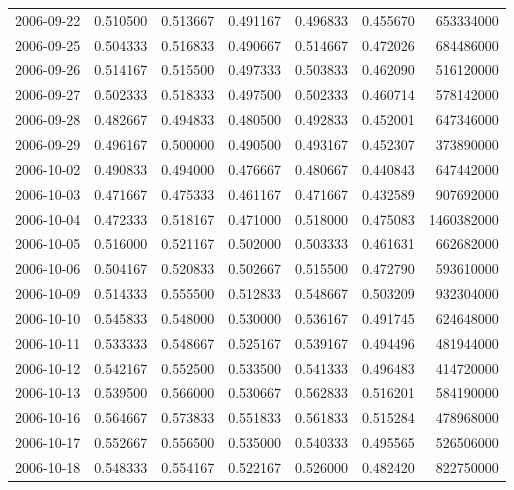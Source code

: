 \begin{tabular}{lrrrrrr}
2006-09-22 &    0.510500 &    0.513667 &    0.491167 &    0.496833 &    0.455670 &   653334000 \\
2006-09-25 &    0.504333 &    0.516833 &    0.490667 &    0.514667 &    0.472026 &   684486000 \\
2006-09-26 &    0.514167 &    0.515500 &    0.497333 &    0.503833 &    0.462090 &   516120000 \\
2006-09-27 &    0.502333 &    0.518333 &    0.497500 &    0.502333 &    0.460714 &   578142000 \\
2006-09-28 &    0.482667 &    0.494833 &    0.480500 &    0.492833 &    0.452001 &   647346000 \\
2006-09-29 &    0.496167 &    0.500000 &    0.490500 &    0.493167 &    0.452307 &   373890000 \\
2006-10-02 &    0.490833 &    0.494000 &    0.476667 &    0.480667 &    0.440843 &   647442000 \\
2006-10-03 &    0.471667 &    0.475333 &    0.461167 &    0.471667 &    0.432589 &   907692000 \\
2006-10-04 &    0.472333 &    0.518167 &    0.471000 &    0.518000 &    0.475083 &  1460382000 \\
2006-10-05 &    0.516000 &    0.521167 &    0.502000 &    0.503333 &    0.461631 &   662682000 \\
2006-10-06 &    0.504167 &    0.520833 &    0.502667 &    0.515500 &    0.472790 &   593610000 \\
2006-10-09 &    0.514333 &    0.555500 &    0.512833 &    0.548667 &    0.503209 &   932304000 \\
2006-10-10 &    0.545833 &    0.548000 &    0.530000 &    0.536167 &    0.491745 &   624648000 \\
2006-10-11 &    0.533333 &    0.548667 &    0.525167 &    0.539167 &    0.494496 &   481944000 \\
2006-10-12 &    0.542167 &    0.552500 &    0.533500 &    0.541333 &    0.496483 &   414720000 \\
2006-10-13 &    0.539500 &    0.566000 &    0.530667 &    0.562833 &    0.516201 &   584190000 \\
2006-10-16 &    0.564667 &    0.573833 &    0.551833 &    0.561833 &    0.515284 &   478968000 \\
2006-10-17 &    0.552667 &    0.556500 &    0.535000 &    0.540333 &    0.495565 &   526506000 \\
2006-10-18 &    0.548333 &    0.554167 &    0.522167 &    0.526000 &    0.482420 &   822750000 \\

\end{tabular}
